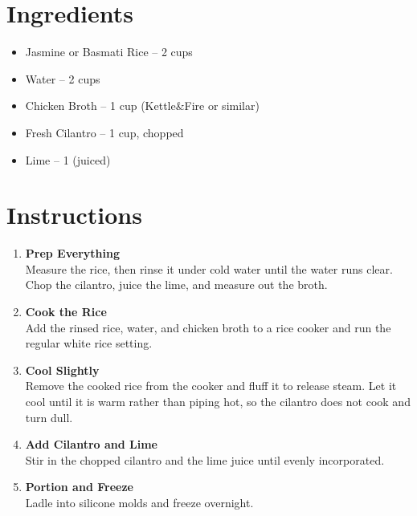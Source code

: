 




\section*{Ingredients}

\begin{itemize}
      \item Jasmine or Basmati Rice – 2 cups
      \item[\measure] Water – 2 cups
      \item[\measure] Chicken Broth – 1 cup (Kettle\&Fire or similar)
      \item[\cut] Fresh Cilantro – 1 cup, chopped
      \item[\measure] Lime – 1 (juiced)
\end{itemize}

\newpage
{}
\section*{Instructions}

\begin{enumerate}

      \item \textbf{Prep Everything} \\
            Measure the rice, then rinse it under cold water until the water runs clear. Chop the cilantro, juice the lime, and measure out the broth.

      \item \textbf{Cook the Rice} \\
            Add the rinsed rice, water, and chicken broth to a rice cooker and run the regular white rice setting.

      \item \textbf{Cool Slightly} \\
            Remove the cooked rice from the cooker and fluff it to release steam. Let it cool until it is warm rather than piping hot, so the cilantro does not cook and turn dull.

      \item \textbf{Add Cilantro and Lime} \\
            Stir in the chopped cilantro and the lime juice until evenly incorporated.

      \item \textbf{Portion and Freeze} \\
            Ladle into silicone molds and freeze overnight.

\end{enumerate}


